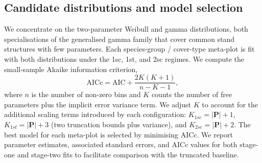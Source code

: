 \subsection{Candidate distributions and model selection}
\label{sec:methods_candidates}

We concentrate on the two-parameter Weibull and gamma distributions, both specialisations of the generalised gamma family that cover common stand structures with few parameters. Each species-group / cover-type meta-plot is fit with both distributions under the 1sc, 1st, and 2sc regimes. We compute the small-sample Akaike information criterion,
\begin{equation}
  \text{AICc} = \text{AIC} + \frac{2K(K+1)}{n - K - 1},
\end{equation}
where $n$ is the number of non-zero bins and $K$ counts the number of free parameters plus the implicit error variance term. We adjust $K$ to account for the additional scaling terms introduced by each configuration: $K_{1sc} = |\bm{P}| + 1$, $K_{1st} = |\bm{P}| + 3$ (two truncation bounds plus variance), and $K_{2sc} = |\bm{P}| + 2$. The best model for each meta-plot is selected by minimising AICc. We report parameter estimates, associated standard errors, and AICc values for both stage-one and stage-two fits to facilitate comparison with the truncated baseline.
